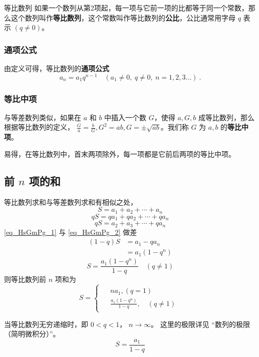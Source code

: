 

\begin{definition}{等比数列}
如果一个数列从第2项起，每一项与它前一项的比都等于同一个常数，那么这个数列叫作\textbf{等比数列}，这个常数叫作等比数列的\textbf{公比}，公比通常用字母 $q$ 表示 $(q\ne 0)$。
\end{definition}

\subsubsection{通项公式}
由定义可得，等比数列的\textbf{通项公式}
\begin{equation}
a_n = a_1 q^{n-1} \quad (a_1 \ne 0,\ q\ne 0,\ n=1,2,3\dots)~.
\end{equation}

\subsubsection{等比中项}
与等差数列类似，如果在 $a$ 和 $b$ 中插入一个数 $G$，使得 $a,G,b$ 成等比数列，那么根据等比数列的定义， $\frac{G}{a} = \frac{b}{G},G^2 = ab,G = \pm \sqrt{ab}$。我们称 $G$ 为 $a,b$ 的\textbf{等比中项}。

易得，在等比数列中，首末两项除外，每一项都是它前后两项的等比中项。

\subsection{前 $n$ 项的和}
等比数列求和与等差数列求和有相似之处，
\begin{equation}\label{eq_HsGmPg_1}
S = a_1 + a_2 + \cdots + a_n
\end{equation}
\begin{equation}
qS = qa_1 + qa_2 + \cdots + qa_n
\end{equation}
\begin{equation}\label{eq_HsGmPg_2}
qS= a_2 + a_3 + \cdots + qa_n
\end{equation}
\autoref{eq_HsGmPg_1} 与 \autoref{eq_HsGmPg_2} 做差
\begin{equation}
\begin{aligned}
(1 - q)S &= a_1 - qa_n\\
&= a_1(1 - q^n)
\end{aligned}
\end{equation}
\begin{equation}
S = \frac{a_1(1-q^n)}{1-q} \quad (q\neq 1)
\end{equation}
则等比数列前 $n$ 项和为
\begin{equation}
S = 
\begin{cases}
\begin{aligned}
&na_1,(q = 1) \\
&\frac{a_1(1-q^n)}{1-q},\quad (q \neq 1)
\end{aligned}
\end{cases}
\end{equation}

当等比数列无穷递缩时，即 $0<q<1$， $n\rightarrow \infty$。 这里的极限详见 “数列的极限（简明微积分）”。
\begin{equation}
S = \frac{a_1}{1 - q}
\end{equation}
